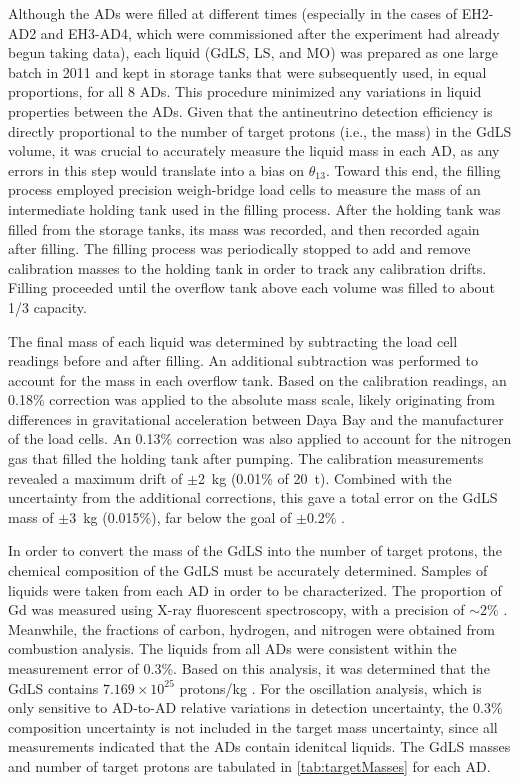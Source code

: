 \documentclass[../thesis.tex]{subfiles}
\begin{document}
Although the ADs were filled at different times (especially in the cases of EH2-AD2 and EH3-AD4, which were commissioned after the experiment had already begun taking data), each liquid (GdLS, LS, and MO) was prepared as one large batch in 2011 and kept in storage tanks that were subsequently used, in equal proportions, for all 8 ADs. This procedure minimized any variations in liquid properties between the ADs. Given that the antineutrino detection efficiency is directly proportional to the number of target protons (i.e., the mass) in the GdLS volume, it was crucial to accurately measure the liquid mass in each AD, as any errors in this step would translate into a bias on $\theta_{13}$. Toward this end, the filling process employed precision weigh-bridge load cells to measure the mass of an intermediate holding tank used in the filling process. After the holding tank was filled from the storage tanks, its mass was recorded, and then recorded again after filling. The filling process was periodically stopped to add and remove calibration masses to the holding tank in order to track any calibration drifts. Filling proceeded until the overflow tank above each volume was filled to about 1/3 capacity.

The final mass of each liquid was determined by subtracting the load cell readings before and after filling. An additional subtraction was performed to account for the mass in each overflow tank. Based on the calibration readings, an 0.18\% correction was applied to the absolute mass scale, likely originating from differences in gravitational acceleration between Daya Bay and the manufacturer of the load cells. An 0.13\% correction was also applied to account for the nitrogen gas that filled the holding tank after pumping. The calibration measurements revealed a maximum drift of $\pm$2~kg (0.01\% of 20~t). Combined with the uncertainty from the additional corrections, this gave a total error on the GdLS mass of $\pm$3~kg (0.015\%), far below the goal of $\pm$0.2\% \cite{AN2016133}.

In order to convert the mass of the GdLS into the number of target protons, the chemical composition of the GdLS must be accurately determined. Samples of liquids were taken from each AD in order to be characterized. The proportion of Gd was measured using X-ray fluorescent spectroscopy, with a precision of $\sim$2\% \cite{AN2016133}. Meanwhile, the fractions of carbon, hydrogen, and nitrogen were obtained from combustion analysis. The liquids from all ADs were consistent within the measurement error of 0.3\%. Based on this analysis, it was determined that the GdLS contains $7.169 \times 10^{25}$ protons/kg \cite{Band_2013}. For the oscillation analysis, which is only sensitive to AD-to-AD relative variations in detection uncertainty, the 0.3\% composition uncertainty is not included in the target mass uncertainty, since all measurements indicated that the ADs contain idenitcal liquids. The GdLS masses and number of target protons are tabulated in \autoref{tab:targetMasses} for each AD.
\end{document}
